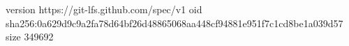 version https://git-lfs.github.com/spec/v1
oid sha256:0a629d9c9a2fa78d64bf26d48865068aa448cf94881e951f7c1cd8be1a039d57
size 349692
